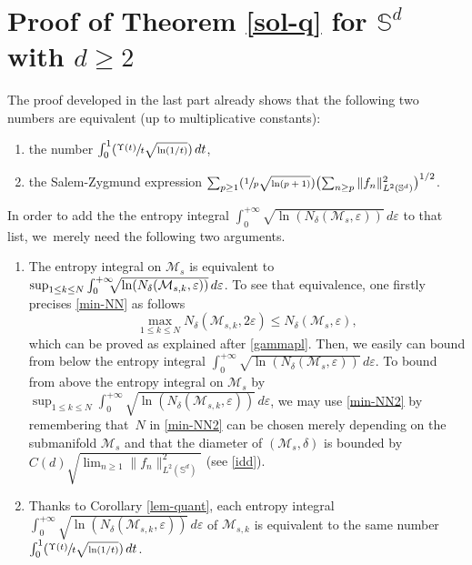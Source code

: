 \documentclass[JEP,XML,SOM,Unicode,NoEqCountersInSection,published]{cedram}
\newcommand{\Psfrac}[2]{(\sfrac{#1}{#2})}
\newenvironment{enumeratei}
{\bgroup\def\theenumi{\roman{enumi}}\def\theenumii{\arabic{enumii}}\begin{enumerate}}
{\end{enumerate}\egroup}
\theoremstyle{theorem}
\theoremstyle{definition}
\newcommand\bbS{\mathbb{S}}
\newcommand\ep{\varepsilon}
\begin{document}
\section{Proof of Theorem \ref{sol-q} for \texorpdfstring{$\bbS^d$ with $d\geq 2$}{Sd2}}\label{preuv-solq}

The proof developed in the last part already shows that the following two numbers are equivalent (up to multiplicative constants):
\begin{enumeratei}
\item the number $ \int_{0}^1 \Psfrac{\Upsilon(t)}{t\sqrt{\ln(1/t)}}\, dt$,
\item the Salem-Zygmund expression $\sum_{p\geq 1} \Psfrac{1}{p\sqrt{\ln(p+1)}} \bigl(\sum_{n\geq p} \|f_n\|_{L^2(\bbS^d)}^2 \bigr)^{1/2}$.
\end{enumeratei}
In order to add the the entropy integral $\int_{0}^{+\infty} \sqrt{\ln(N_{\delta}(\mathcal{M}_s,\ep))}\,d\ep$ to that list, we~merely need the following two arguments.

\begin{enumerate}\renewcommand{\theenumi}{\alph{enumi}}
\item
The entropy integral on $\mathcal{M}_s$ is equivalent to $\sup_{1\leq k\leq N}
\int_{0}^{+\infty} \hspace*{-2mm}\sqrt{\ln(N_{\delta}(\mathcal{M}_{s,k},\ep))}\,d\ep$. To see that equivalence, one firstly precises \eqref{min-NN} as follows
\begin{equation*}
\max_{1\leq k\leq N} N_{\delta}(\mathcal{M}_{s,k},2\ep) \leq N_{\delta}(\mathcal{M}_s,\ep),
\end{equation*}
which can be proved as explained after \eqref{gammapl}. Then, we easily can bound from below the
entropy integral $
\int_{0}^{+\infty} \sqrt{\ln(N_{\delta}(\mathcal{M}_s,\ep))}\,d\ep$. To bound from above the entropy integral on $\mathcal{M}_s$ by $\sup_{1\leq k\leq N}
\int_{0}^{+\infty} \sqrt{\ln(N_{\delta}(\mathcal{M}_{s,k},\ep))}\,d\ep$, we may use \eqref{min-NN2} by remembering that~$N$ in
\eqref{min-NN2} can be chosen merely depending on the submanifold $\mathcal{M}_s$ and that the diameter of $(\mathcal{M}_s,\delta)$ is bounded by $C(d)\sqrt{\lim_{n\geq 1} \|f_n\|_{L^2(\bbS^d)}^2}$ (see \eqref{idd}).

\item
Thanks to Corollary \ref{lem-quant}, each entropy integral
$\int_{0}^{+\infty} \sqrt{\ln(N_{\delta}(\mathcal{M}_{s,k},\ep))}\,d\ep$ of $\mathcal{M}_{s,k}$ is equivalent to the same number $ \int_{0}^1 \Psfrac{\Upsilon(t)}{t\sqrt{\ln(1/t)}} \,dt$.
\end{enumerate}
\end{document}
